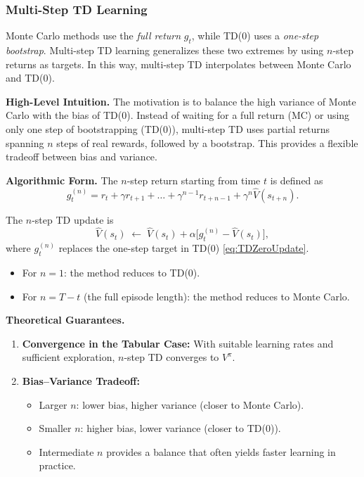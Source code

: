 \documentclass[
]{book}
\theoremstyle{definition}
\theoremstyle{definition}
\theoremstyle{definition}
\theoremstyle{definition}
\theoremstyle{remark}
\begin{document}
\subsubsection{Multi-Step TD Learning}\label{multi-step-td-learning}

Monte Carlo methods use the \emph{full return} \(g_t\), while TD(0) uses a \emph{one-step bootstrap}. Multi-step TD learning generalizes these two extremes by using \(n\)-step returns as targets. In this way, multi-step TD interpolates between Monte Carlo and TD(0).

\textbf{High-Level Intuition.} The motivation is to balance the high variance of Monte Carlo with the bias of TD(0). Instead of waiting for a full return (MC) or using only one step of bootstrapping (TD(0)), multi-step TD uses partial returns spanning \(n\) steps of real rewards, followed by a bootstrap. This provides a flexible tradeoff between bias and variance.

\textbf{Algorithmic Form.} The \(n\)-step return starting from time \(t\) is defined as
\begin{equation}
g_t^{(n)} = r_t + \gamma r_{t+1} + \dots + \gamma^{n-1} r_{t+n-1} + \gamma^n \hat{V}(s_{t+n}).
\label{eq:nStepReturn}
\end{equation}

The \(n\)-step TD update is
\begin{equation}
\hat{V}(s_t) \;\leftarrow\; \hat{V}(s_t) + \alpha \big[ g_t^{(n)} - \hat{V}(s_t) \big],
\label{eq:nStepTDUpdate}
\end{equation}
where \(g_t^{(n)}\) replaces the one-step target in TD(0) \eqref{eq:TDZeroUpdate}.

\begin{itemize}
\item
  For \(n=1\): the method reduces to TD(0).
\item
  For \(n=T-t\) (the full episode length): the method reduces to Monte Carlo.
\end{itemize}

\textbf{Theoretical Guarantees.}

\begin{enumerate}
\def\labelenumi{\arabic{enumi}.}
\item
  \textbf{Convergence in the Tabular Case:} With suitable learning rates and sufficient exploration, \(n\)-step TD converges to \(V^\pi\).
\item
  \textbf{Bias--Variance Tradeoff:}

  \begin{itemize}
  \item
    Larger \(n\): lower bias, higher variance (closer to Monte Carlo).
  \item
    Smaller \(n\): higher bias, lower variance (closer to TD(0)).
  \item
    Intermediate \(n\) provides a balance that often yields faster learning in practice.
  \end{itemize}
\end{enumerate}
\end{document}
